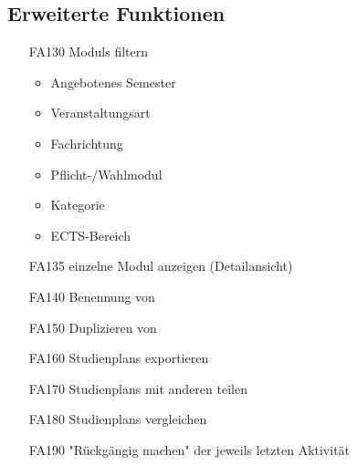 	\subsection{Erweiterte Funktionen}
		\begin{itemize}[nosep]
		\item [FA130] \glspl{Modul} filtern
		\begin{itemize}
		\item Angebotenes Semester
		\item Veranstaltungsart
		\item Fachrichtung
		\item Pflicht-/Wahlmodul
		\item Kategorie
		\item ECTS-Bereich
		\end{itemize}
		\item[FA135] einzelne \gls{Modul} anzeigen (Detailansicht)
		\item [FA140]	Benennung von
		\item [FA150] Duplizieren von 
		\item [FA160] \glspl{Studienplan} exportieren
		\item [FA170] \glspl{Studienplan} mit anderen teilen
		\item[FA180] \glspl{Studienplan} vergleichen
		\item [FA190] "Rückgängig machen" der jeweils letzten Aktivität
		\end{itemize}

